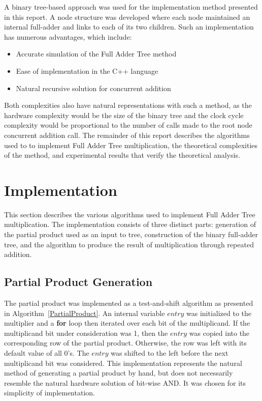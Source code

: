 \documentclass{article}
\begin{document}
A binary tree-based approach was used for the implementation method presented in this report. A node structure was developed where each node maintained an internal full-adder and links to each of its two children. Such an implementation has numerous advantages, which include:

\begin{itemize}
	\item	Accurate simulation of the Full Adder Tree method
	\item Ease of implementation in the C++ language
	\item Natural recursive solution for concurrent addition
\end{itemize}

Both complexities also have natural representations with such a method, as the hardware complexity would be the size of the binary tree and the clock cycle complexity would be proportional to the number of calls made to the root node concurrent addition call. The remainder of this report describes the algorithms used to to implement Full Adder Tree multiplication, the theoretical complexities of the method, and experimental results that verify the theoretical analysis.

\section{Implementation}
This section describes the various algorithms used to implement Full Adder Tree multiplication. The implementation consists of three distinct parts: generation of the partial product used as an input to tree, construction of the binary full-adder tree, and the algorithm to produce the result of multiplication through repeated addition.

\subsection{Partial Product Generation}
The partial product was implemented as a test-and-shift algorithm as presented in Algorithm~\ref{PartialProduct}. An internal variable $entry$ was initialized to the multiplier and a \textbf{for} loop then iterated over each bit of the multiplicand. If the multiplicand bit under consideration was 1, then the $entry$ was copied into the corresponding row of the partial product. Otherwise, the row was left with its default value of all 0's. The $entry$ was shifted to the left before the next multiplicand bit was considered. This implementation represents the natural method of generating a partial product by hand, but does not necessarily resemble the natural hardware solution of bit-wise AND. It was chosen for its simplicity of implementation.
\end{document}
